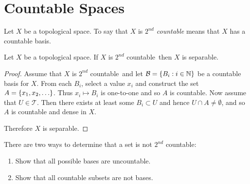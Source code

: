 \documentclass[letterpaper,12pt,fleqn]{article}
\newcommand{\T}{\mathscr{T}}
\newcommand{\B}{\mathcal{B}}
\renewcommand{\sc}{\(2^{nd}\) countable}
\begin{document}
\section*{Countable Spaces}

\begin{definition}[\(2^{nd}\) Countable]
  Let \(X\) be a topological space.  To say that \(X\) is \emph{\sc} means that \(X\) has a countable basis.
\end{definition}

\begin{theorem}
  Let \(X\) be a topological space.  If \(X\) is \sc\ then \(X\) is separable.
\end{theorem}

\begin{proof}
  Assume that \(X\) is \sc\ and let \(\B=\set{B_i:i\in\N}\) be a countable basis for \(X\).  From each \(B_i\),
  select a value \(x_i\) and construct the set \(A=\{x_1,x_2,\ldots\}\).  Thus \(x_i\mapsto B_i\) is one-to-one
  and so \(A\) is countable.  Now assume that \(U\in\T\).  Then there exists at least some \(B_i\subset U\) and
  hence \(U\cap A\ne\emptyset\), and so \(A\) is countable and dense in \(X\).

  Therefore \(X\) is separable.
\end{proof}

There are two ways to determine that a set is not \sc:
\begin{enumerate}
\item Show that all possible bases are uncountable.
\item Show that all countable subsets are not bases.
\end{enumerate}
\end{document}
